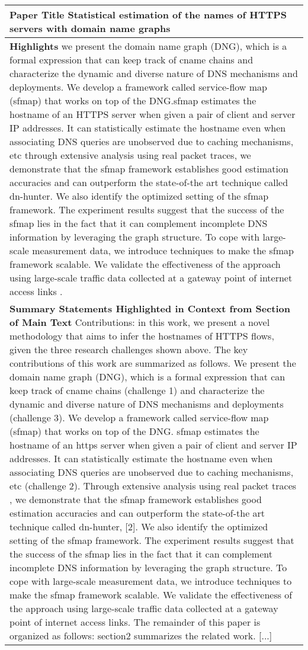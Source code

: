 \documentclass[11pt,a4paper]{article}
\begin{document}
\begin{table}[t]
\fontsize{8}{8}\selectfont
\begin{center}
\begin{tabularx}{\linewidth}{X}
\toprule
\textbf{Paper Title} Statistical estimation of the names of HTTPS servers with domain name graphs \\ \midrule
\textbf{Highlights} we present the domain name graph (DNG), which is a formal expression that can keep track of cname chains and characterize the dynamic and diverse nature of DNS mechanisms and deployments. We develop a framework called service-flow map (sfmap) that works on top of the DNG.sfmap estimates the hostname of an HTTPS server when given a pair of client and server IP addresses. It can statistically estimate the hostname even when associating DNS queries are unobserved due to caching mechanisms, etc through extensive analysis using real packet traces, we demonstrate that the sfmap framework establishes good estimation accuracies and can outperform the state-of-the art technique called dn-hunter. We also identify the optimized setting of the sfmap framework. The experiment results suggest that the success of the sfmap lies in the fact that it can complement incomplete DNS information by leveraging the graph structure. To cope with large-scale measurement data, we introduce techniques to make the sfmap framework scalable. We validate the effectiveness of the approach using large-scale traffic data collected at a gateway point of internet access links .\\ \midrule
\textbf{Summary Statements Highlighted in Context from Section of Main Text}
Contributions: in this work, we present a novel methodology that aims to infer the hostnames of HTTPS flows, given the three research challenges shown above. The key contributions of this work are summarized as follows. {\color{red} We present the domain name graph (DNG), which is a formal expression that can keep track of cname chains (challenge 1) and characterize the dynamic and diverse nature of DNS mechanisms and deployments (challenge 3). We develop a framework called service-flow map (sfmap) that works on top of the DNG. sfmap estimates the hostname of an https server when given a pair of client and server IP addresses.} It can statistically estimate the hostname even when associating DNS queries are unobserved due to caching mechanisms, etc (challenge 2). Through extensive analysis using real packet traces , we demonstrate that the sfmap framework establishes good estimation accuracies and can outperform the state-of-the art technique called dn-hunter, [2]. {\color{red} We also identify the optimized setting of the sfmap framework. The experiment results suggest that the success of the sfmap lies in the fact that it can complement incomplete DNS information by leveraging the graph structure. To cope with large-scale measurement data, we introduce techniques to make the sfmap framework scalable. We validate the effectiveness of the approach using large-scale traffic data collected at a gateway point of internet access links.} The remainder of this paper is organized as follows: section2 summarizes the related work. [...]\\

\end{tabularx}
\end{center}
\end{table}
\end{document}
